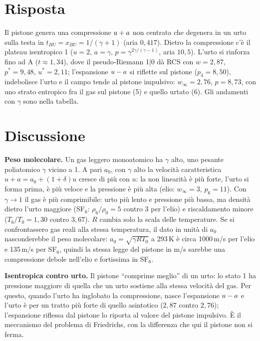 \section*{Risposta}
Il pistone genera una compressione $u+a$ non centrata che degenera in un urto sulla testa in
$t_{BU}=x_{BU}=1/(\gamma+1)$ (aria $0{,}417$). Dietro la compressione c'è il plateau isentropico 1 ($u=2$,
$a=\gamma$, $p=\gamma^{2\gamma/(\gamma-1)}$, aria $10{,}5$). L'urto si rinforza fino ad A ($t\approx1{,}34$), dove
il pseudo-Riemann 1|0 dà RCS con $w=2{,}87$, $p^*=9{,}48$, $u^*=2{,}11$; l'espansione $u-a$ si riflette sul pistone
($p_4=8{,}50$), indebolisce l'urto e il campo tende al pistone impulsivo: $w_\infty=2{,}76$, $p=8{,}73$, con uno
strato entropico fra il gas sul pistone (5) e quello urtato (6). Gli andamenti con $\gamma$ sono nella tabella.

\section*{Discussione}
\textbf{Peso molecolare.} Un gas leggero monoatomico ha $\gamma$ alto, uno pesante poliatomico $\gamma$ vicino a 1. A
pari $a_0$, con $\gamma$ alto la velocità caratteristica $u+a=a_0+(1+\delta)u$ cresce di più con $u$: la non linearità
è più forte, l'urto si forma prima, è più veloce e la pressione è più alta (elio: $w_\infty=3$, $p_6=11$). Con
$\gamma\to1$ il gas è più comprimibile: urto più lento e pressione più bassa, ma densità dietro l'urto maggiore
(SF$_6$: $\rho_6/\rho_0=5$ contro 3 per l'elio) e riscaldamento minore ($T_6/T_0=1{,}30$ contro $3{,}67$). $R$ cambia
solo la scala delle temperature. Se si confrontassero gas reali alla stessa temperatura, il dato in unità di $a_0$
nasconderebbe il peso molecolare: $a_0=\sqrt{\gamma RT_0}$ a 293\,K è circa 1000\,m/s per l'elio e 135\,m/s per
SF$_6$, quindi la stessa legge del pistone in m/s sarebbe una compressione debole nell'elio e fortissima in SF$_6$.

\textbf{Isentropica contro urto.} Il pistone ``comprime meglio'' di un urto: lo stato 1 ha pressione maggiore di
quella che un urto sostiene alla stessa velocità del gas. Per questo, quando l'urto ha inglobato la compressione,
nasce l'espansione $u-a$ e l'urto è per un tratto più forte di quello asintotico ($2{,}87$ contro $2{,}76$);
l'espansione riflessa dal pistone lo riporta al valore del pistone impulsivo. È il meccanismo del problema di
Friedrichs, con la differenza che qui il pistone non si ferma.

